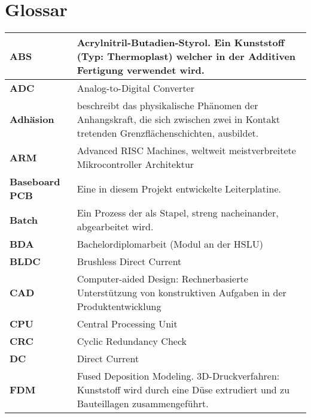\section*{Glossar}\label{dok:glossar}
\begin{table}[H]
	\footnotesize
	\begin{tabular}{|L{3cm}|L{12.5cm}|}
		\hline	
		\textbf{ABS} & Acrylnitril-Butadien-Styrol. Ein Kunststoff (Typ: Thermoplast) welcher in der Additiven Fertigung verwendet wird.\\
		
		\hline	
		\textbf{ADC} & Analog-to-Digital Converter\\
		
		\hline
		\textbf{Adhäsion} & beschreibt das physikalische Phänomen der Anhangskraft, die sich zwischen zwei in Kontakt tretenden Grenzflächenschichten, ausbildet. \\		

		\hline	
		\textbf{ARM} & Advanced RISC Machines, weltweit meistverbreitete Mikrocontroller Architektur\\

		\hline
		\textbf{Baseboard PCB} & Eine in diesem Projekt entwickelte Leiterplatine. \\

		\hline
		\textbf{Batch} & Ein Prozess der als Stapel, streng nacheinander, abgearbeitet wird.  \\

		\hline
		\textbf{BDA} & Bachelordiplomarbeit (Modul an der HSLU) \\

		\hline
		\textbf{BLDC} & Brushless Direct Current\\

		\hline
		\textbf{CAD} & Computer-aided Design: Rechnerbasierte Unterstützung von konstruktiven Aufgaben in der Produktentwicklung \\
		
		\hline
		\textbf{CPU} & Central Processing Unit \\
		
		\hline
		\textbf{CRC} & Cyclic Redundancy Check \\

		\hline	
		\textbf{DC} & Direct Current\\

		\hline
		\textbf{FDM} & Fused Deposition Modeling. 3D-Druckverfahren: Kunststoff wird durch eine Düse extrudiert und zu Bauteillagen zusammengeführt.\\


\end{tabular}
\end{table}
